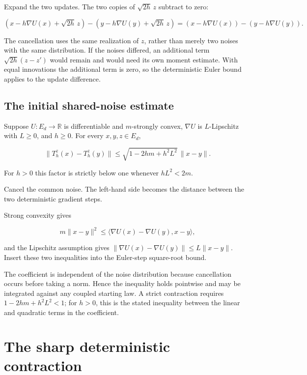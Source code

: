 \documentclass[11pt,a4paper]{article}
\begin{document}
Expand the two updates. The two copies of \(\sqrt{2h}\,z\) subtract to zero:

\[(x-h\nabla U(x)+\sqrt{2h}\,z)-(y-h\nabla U(y)+\sqrt{2h}\,z)=(x-h\nabla U(x))-(y-h\nabla U(y)).\]

The cancellation uses the same realization of \(z\), rather than merely two noises with the same distribution. If the noises differed, an additional term \(\sqrt{2h}(z-z')\) would remain and would need its own moment estimate. With equal innovations the additional term is zero, so the deterministic Euler bound applies to the update difference.


\subsection{\texorpdfstring{The initial shared-noise estimate}{The initial shared-noise estimate}}


Suppose \(U:E_d\to\mathbb R\) is differentiable and \(m\)-strongly convex, \(\nabla U\) is \(L\)-Lipschitz with \(L\ge0\), and \(h\ge0\). For every \(x,y,z\in E_d\),

\[\|T_h^z(x)-T_h^z(y)\|\le\sqrt{1-2hm+h^2L^2}\,\|x-y\|.\]

For \(h>0\) this factor is strictly below one whenever \(hL^2<2m\).



Cancel the common noise. The left-hand side becomes the distance between the two deterministic gradient steps.



Strong convexity gives

\[m\|x-y\|^2\le\langle\nabla U(x)-\nabla U(y),x-y\rangle,\]

and the Lipschitz assumption gives \(\|\nabla U(x)-\nabla U(y)\|\le L\|x-y\|\). Insert these two inequalities into the Euler-step square-root bound.



The coefficient is independent of the noise distribution because cancellation occurs before taking a norm. Hence the inequality holds pointwise and may be integrated against any coupled starting law. A strict contraction requires \(1-2hm+h^2L^2<1\); for \(h>0\), this is the stated inequality between the linear and quadratic terms in the coefficient.


\section{\texorpdfstring{The sharp deterministic contraction}{The sharp deterministic contraction}}
\end{document}
